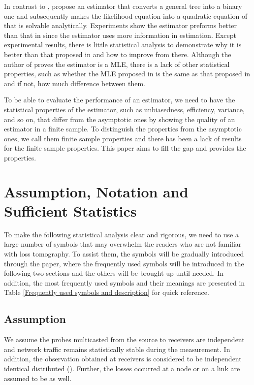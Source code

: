 \documentclass[10pt,onecolumn]{IEEEtran}
\begin{document}
In contrast to \cite{DHPT06}, \cite{ADV07, Zhu11a} propose an estimator that converts a general tree into a binary one and subsequently makes the likelihood equation into a quadratic equation of   that is solvable analytically.   Experiments show the estimator preforms better than that in \cite{DHPT06} since the estimator uses more information in estimation.  Except experimental results, there is little statistical analysis to demonstrate why it is better than that proposed in \cite{DHPT06} and how to improve from there. Although the author of \cite{Zhu11a} proves the estimator is a MLE, there is a lack of other statistical properties, such as whether the MLE proposed in \cite{Zhu11a} is the same as that proposed in \cite{CDHT99} and if not, how much difference between them.

To be able to evaluate the performance of an estimator, we need to have the statistical properties of the estimator, such as unbiasedness, efficiency, variance, and so on, that differ from the asymptotic ones by showing the quality of an estimator in a finite sample. To distinguish the properties from the asymptotic ones, we call them finite sample properties and there has been a lack of results for the finite sample properties.  This paper aims to fill the gap and provides the properties.

\section{Assumption, Notation and Sufficient Statistics} \label{section2}

 To make the following statistical analysis clear and rigorous, we need to use  a large number of symbols that may overwhelm the readers who are not familiar with loss tomography. To assist them, the symbols  will be gradually introduced through the paper, where the frequently used symbols will be introduced in the following two sections and the others will be brought up  until needed. In addition, the most frequently used symbols and their meanings are presented in Table \ref{Frequently used symbols and description} for quick reference.


\subsection{Assumption}
We assume the probes multicasted from the source to receivers are
independent and network traffic remains statistically stable during the measurement. In addition, the observation obtained at receivers  is considered to be independent identical distributed
(). Further, the losses occurred at a node or on a link are assumed to be   as well.
\end{document}
